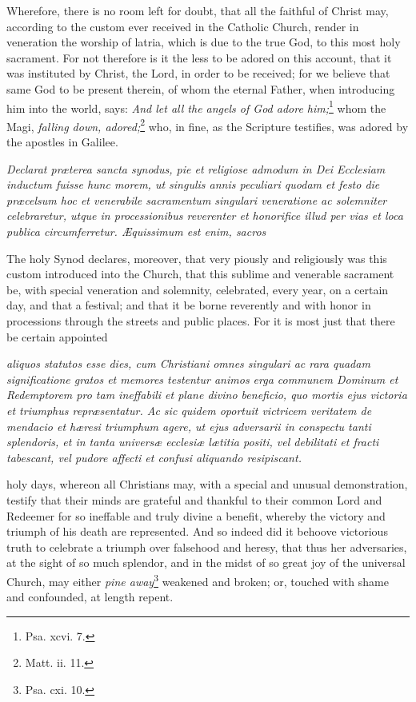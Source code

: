 Wherefore, there is no room left for doubt, that all the faithful of Christ may, according to the custom ever received in the Catholic Church, render in veneration the worship of latria, which is due to the true God, to this most holy sacrament. For not therefore is it the less to be adored on this account, that it was instituted by Christ, the Lord, in order to be received; for we believe that same God to be present therein, of whom the eternal Father, when introducing him into the world, says: \emph{And let all the angels of God adore him;}\footnote{\par   Psa. xcvi. 7.} whom the Magi, \emph{falling down, adored;}\footnote{\par   Matt. ii. 11.} who, in fine, as the Scripture testifies, was adored by the apostles in Galilee.

\emph{Declarat præterea sancta synodus, pie et religiose admodum in Dei Ecclesiam inductum fuisse hunc morem, ut singulis annis peculiari quodam et festo die præcelsum hoc et venerabile sacramentum singulari veneratione ac solemniter celebraretur, utque in processionibus reverenter et honorifice illud per vias et loca publica circumferretur. Æquissimum est enim, sacros }

The holy Synod declares, moreover, that very piously and religiously was this custom introduced into the Church, that this sublime and venerable sacrament be, with special veneration and solemnity, celebrated, every year, on a certain day, and that a festival; and that it be borne reverently and with honor in processions through the streets and public places. For it is most just that there be certain appointed

\emph{aliquos statutos esse dies, cum Christiani omnes singulari ac rara quadam significatione gratos et memores testentur animos erga communem Dominum et Redemptorem pro tam ineffabili et plane divino beneficio, quo mortis ejus victoria et triumphus repræsentatur. Ac sic quidem oportuit victricem veritatem de mendacio et hæresi triumphum agere, ut ejus adversarii in conspectu tanti splendoris, et in tanta universæ ecclesiæ lætitia positi, vel debilitati et fracti tabescant, vel pudore affecti et confusi aliquando resipiscant.}

holy days, whereon all Christians may, with a special and unusual demonstration, testify that their minds are grateful and thankful to their common Lord and Redeemer for so ineffable and truly divine a benefit, whereby the victory and triumph of his death are represented. And so indeed did it behoove victorious truth to celebrate a triumph over falsehood and heresy, that thus her adversaries, at the sight of so much splendor, and in the midst of so great joy of the universal Church, may either \emph{pine away}\footnote{\par   Psa. cxi. 10.} weakened and broken; or, touched with shame and confounded, at length repent.

